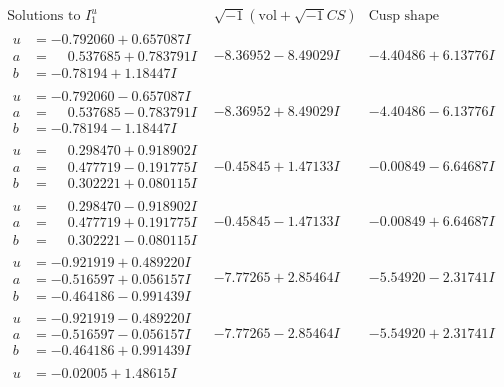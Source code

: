 \documentclass[1p]{elsarticle_modified}
\theoremstyle{definition}
\newcommand{\I}{\sqrt{-1}}
\begin{document}
$$\begin{array}{c|c|c}  
\text{Solutions to }I^u_{1}& \I (\text{vol} + \sqrt{-1}CS) & \text{Cusp shape}\\
 \hline 
\begin{aligned}
u &= -0.792060 + 0.657087 I \\
a &= \phantom{-}0.537685 + 0.783791 I \\
b &= -0.78194 + 1.18447 I\end{aligned}
 & -8.36952 - 8.49029 I & -4.40486 + 6.13776 I \\ \hline\begin{aligned}
u &= -0.792060 - 0.657087 I \\
a &= \phantom{-}0.537685 - 0.783791 I \\
b &= -0.78194 - 1.18447 I\end{aligned}
 & -8.36952 + 8.49029 I & -4.40486 - 6.13776 I \\ \hline\begin{aligned}
u &= \phantom{-}0.298470 + 0.918902 I \\
a &= \phantom{-}0.477719 - 0.191775 I \\
b &= \phantom{-}0.302221 + 0.080115 I\end{aligned}
 & -0.45845 + 1.47133 I & -0.00849 - 6.64687 I \\ \hline\begin{aligned}
u &= \phantom{-}0.298470 - 0.918902 I \\
a &= \phantom{-}0.477719 + 0.191775 I \\
b &= \phantom{-}0.302221 - 0.080115 I\end{aligned}
 & -0.45845 - 1.47133 I & -0.00849 + 6.64687 I \\ \hline\begin{aligned}
u &= -0.921919 + 0.489220 I \\
a &= -0.516597 + 0.056157 I \\
b &= -0.464186 - 0.991439 I\end{aligned}
 & -7.77265 + 2.85464 I & -5.54920 - 2.31741 I \\ \hline\begin{aligned}
u &= -0.921919 - 0.489220 I \\
a &= -0.516597 - 0.056157 I \\
b &= -0.464186 + 0.991439 I\end{aligned}
 & -7.77265 - 2.85464 I & -5.54920 + 2.31741 I \\ \hline\begin{aligned}
u &= -0.02005 + 1.48615 I \\

\end{aligned}
\end{array}$$
\end{document}
